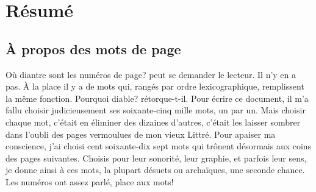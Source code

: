 \cleartorecto
\phantom{a}
\vfill
\begin{minipage}{26pc}
\section*{Résumé}

\end{minipage}
\vfill
\phantom{a}

\cleartoverso
\tableofcontents*

\vfill

\begin{minipage}{0.8\textwidth}
\subsection*{À propos des mots de page}
\og Où diantre sont les numéros de page?\fg{} peut se demander le lecteur.  Il n'y en
a pas.  À la place il y a de mots qui, rangés par ordre lexicographique,
remplissent la même fonction.  \og Pourquoi diable?\fg{} rétorque-t-il.  Pour
écrire ce document, il m'a fallu choisir judicieusement ses soixante-cinq mille
mots, un par un.  Mais choisir chaque mot, c'était en éliminer des dizaines
d'autres, c'était les laisser sombrer dans l'oubli des pages vermoulues de mon
vieux Littré.  Pour apaiser ma conscience, j'ai choisi cent soixante-dix sept
mots qui trônent désormais aux coins des pages suivantes.  Choisis pour leur
sonorité, leur graphie, et parfois leur sens, je donne ainsi à ces mots, la
plupart désuets ou archaïques, une seconde chance.  Les numéros ont assez parlé,
place aux mots!
\end{minipage}
\restoregeometry

\mainmatter
\pagestyle{companion}


\backmatter

\printbibliography
\restoregeometry



